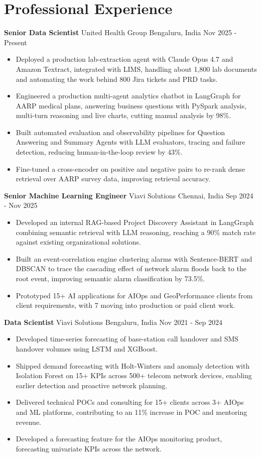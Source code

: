 \documentclass[10pt,a4paper]{article}
\newcommand{\role}[4]{\textbf{#1} \textbar{} #2 \hfill #3 \textbar{} #4\par}
\begin{document}
\section{Professional Experience}
\role{Senior Data Scientist}{United Health Group}{Bengaluru, India}{Nov 2025 - Present}
\begin{itemize}
  \item Deployed a production lab-extraction agent with Claude Opus 4.7 and Amazon Textract, integrated with LIMS, handling about 1,800 lab documents and automating the work behind 800 Jira tickets and PRD tasks.
  \item Engineered a production multi-agent analytics chatbot in LangGraph for AARP medical plans, answering business questions with PySpark analysis, multi-turn reasoning and live charts, cutting manual analysis by 98\%.
  \item Built automated evaluation and observability pipelines for Question Answering and Summary Agents with LLM evaluators, tracing and failure detection, reducing human-in-the-loop review by 43\%.
  \item Fine-tuned a cross-encoder on positive and negative pairs to re-rank dense retrieval over AARP survey data, improving retrieval accuracy.
\end{itemize}
\vspace{3pt}
\role{Senior Machine Learning Engineer}{Viavi Solutions}{Chennai, India}{Sep 2024 - Nov 2025}
\begin{itemize}
  \item Developed an internal RAG-based Project Discovery Assistant in LangGraph combining semantic retrieval with LLM reasoning, reaching a 90\% match rate against existing organizational solutions.
  \item Built an event-correlation engine clustering alarms with Sentence-BERT and DBSCAN to trace the cascading effect of network alarm floods back to the root event, improving semantic alarm classification by 73.5\%.
  \item Prototyped 15+ AI applications for AIOps and GeoPerformance clients from client requirements, with 7 moving into production or paid client work.
\end{itemize}
\vspace{3pt}
\role{Data Scientist}{Viavi Solutions}{Bengaluru, India}{Nov 2021 - Sep 2024}
\begin{itemize}
  \item Developed time-series forecasting of base-station call handover and SMS handover volumes using LSTM and XGBoost.
  \item Shipped demand forecasting with Holt-Winters and anomaly detection with Isolation Forest on 15+ KPIs across 500+ telecom network devices, enabling earlier detection and proactive network planning.
  \item Delivered technical POCs and consulting for 15+ clients across 3+ AIOps and ML platforms, contributing to an 11\% increase in POC and mentoring revenue.
  \item Developed a forecasting feature for the AIOps monitoring product, forecasting univariate KPIs across the network.
\end{itemize}
\end{document}
